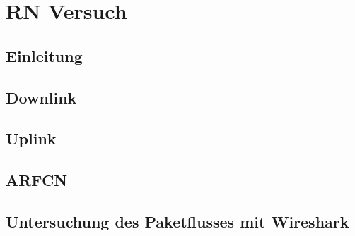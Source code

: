 
\chapter{RN Versuch}
\section{Einleitung}

\section{Downlink}

\section{Uplink}

\section{ARFCN}


\section{Untersuchung des Paketflusses mit Wireshark}

